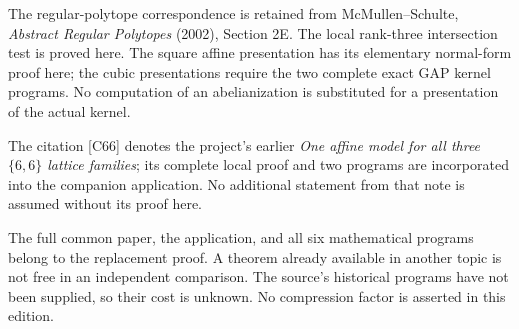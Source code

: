 The regular-polytope correspondence is retained from McMullen--Schulte, \emph{Abstract Regular Polytopes} (2002), Section 2E. The local rank-three intersection test is proved here. The square affine presentation has its elementary normal-form proof here; the cubic presentations require the two complete exact GAP kernel programs. No computation of an abelianization is substituted for a presentation of the actual kernel.

The citation [C66] denotes the project's earlier \emph{One affine model for all three $\{6,6\}$ lattice families}; its complete local proof and two programs are incorporated into the companion application. No additional statement from that note is assumed without its proof here.

The full common paper, the application, and all six mathematical programs belong to the replacement proof. A theorem already available in another topic is not free in an independent comparison. The source's historical programs have not been supplied, so their cost is unknown. No compression factor is asserted in this edition.

